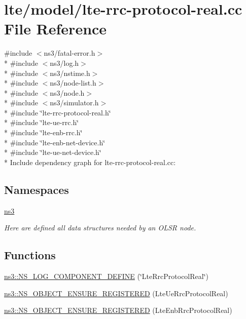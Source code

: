 \hypertarget{lte-rrc-protocol-real_8cc}{}\section{lte/model/lte-\/rrc-\/protocol-\/real.cc File Reference}
\label{lte-rrc-protocol-real_8cc}
{\ttfamily \#include $<$ns3/fatal-\/error.\+h$>$}\\*
{\ttfamily \#include $<$ns3/log.\+h$>$}\\*
{\ttfamily \#include $<$ns3/nstime.\+h$>$}\\*
{\ttfamily \#include $<$ns3/node-\/list.\+h$>$}\\*
{\ttfamily \#include $<$ns3/node.\+h$>$}\\*
{\ttfamily \#include $<$ns3/simulator.\+h$>$}\\*
{\ttfamily \#include \char`\"{}lte-\/rrc-\/protocol-\/real.\+h\char`\"{}}\\*
{\ttfamily \#include \char`\"{}lte-\/ue-\/rrc.\+h\char`\"{}}\\*
{\ttfamily \#include \char`\"{}lte-\/enb-\/rrc.\+h\char`\"{}}\\*
{\ttfamily \#include \char`\"{}lte-\/enb-\/net-\/device.\+h\char`\"{}}\\*
{\ttfamily \#include \char`\"{}lte-\/ue-\/net-\/device.\+h\char`\"{}}\\*
Include dependency graph for lte-\/rrc-\/protocol-\/real.cc\+:
\subsection*{Namespaces}
\begin{DoxyCompactItemize}
\item 
 \hyperlink{namespacens3}{ns3}
\begin{DoxyCompactList}\small\item\em Here are defined all data structures needed by an O\+L\+SR node. \end{DoxyCompactList}\end{DoxyCompactItemize}
\subsection*{Functions}
\begin{DoxyCompactItemize}
\item 
\hyperlink{namespacens3_a90d864392403c0f959b003f133dd7e35}{ns3\+::\+N\+S\+\_\+\+L\+O\+G\+\_\+\+C\+O\+M\+P\+O\+N\+E\+N\+T\+\_\+\+D\+E\+F\+I\+NE} (\char`\"{}Lte\+Rrc\+Protocol\+Real\char`\"{})
\item 
\hyperlink{namespacens3_a509fdc9794a005171995556516c445a9}{ns3\+::\+N\+S\+\_\+\+O\+B\+J\+E\+C\+T\+\_\+\+E\+N\+S\+U\+R\+E\+\_\+\+R\+E\+G\+I\+S\+T\+E\+R\+ED} (Lte\+Ue\+Rrc\+Protocol\+Real)
\item 
\hyperlink{namespacens3_ad08b52c60caeeef1bcc3a73cc24a5962}{ns3\+::\+N\+S\+\_\+\+O\+B\+J\+E\+C\+T\+\_\+\+E\+N\+S\+U\+R\+E\+\_\+\+R\+E\+G\+I\+S\+T\+E\+R\+ED} (Lte\+Enb\+Rrc\+Protocol\+Real)
\end{DoxyCompactItemize}
